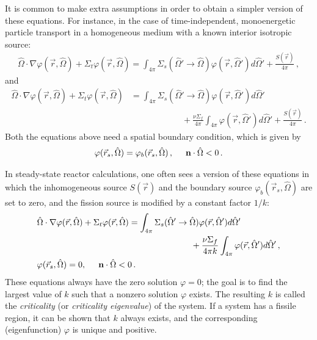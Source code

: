 \documentclass[12pt]{article}
\newcommand{\rvec}{\ensuremath{\vec{r}}}
\newcommand{\omvec}{\ensuremath{\hat{\Omega}}}
\begin{document}
It is common to make extra assumptions in order to obtain a simpler version of these equations. For instance, in the case of time-independent, monoenergetic particle transport in a homogeneous medium with a known interior isotropic source:
\begin{align*}
\omvec\cdot  \nabla \varphi(\rvec,\omvec) +
 \Sigma_t\varphi(\rvec,\omvec)
=
\int_{4\pi}\Sigma_s(\omvec'\rightarrow\omvec)
\varphi(\rvec,\omvec')d\omvec'+\frac{S(\rvec)}{4\pi}\,,
\end{align*}
and 
\begin{align*}
\omvec\cdot  \nabla \varphi(\rvec,\omvec) +
 \Sigma_t\varphi(\rvec,\omvec)%
 &=
\int_{4\pi}\Sigma_s(\omvec'\rightarrow\omvec)
\varphi(\rvec,\omvec')d\omvec'\\&\quad\quad\quad\quad\quad\quad
 +\frac{\nu\Sigma_f}{4\pi}\int_{4\pi}
\varphi(\rvec,\omvec')d\omvec'+\frac{S(\rvec)}{4\pi}\,.\nonumber
\end{align*}
Both the equations above need a spatial boundary condition, which is given by
\begin{align*}
\varphi(\rvec_s,\omvec) = \varphi_b(\rvec_s,\omvec)\,, \hspace{0.5 cm} \textbf{n} \cdot \omvec <0\,.
\end{align*}

In steady-state reactor calculations, one often sees a version of these equations in which the inhomogeneous source $S(\rvec)$ and the boundary source $\varphi_b(\rvec_s,\omvec)$ are set to zero, and the fission source is modified by a constant factor $1/k$:
\begin{align*}
&\omvec\cdot  \nabla \varphi(\rvec,\omvec) +
 \Sigma_t\varphi(\rvec,\omvec)%
 =
\int_{4\pi}\Sigma_s(\omvec'\rightarrow\omvec)
\varphi(\rvec,\omvec')d\omvec'\\&\quad\quad\quad\quad\quad\quad\quad\quad\quad\quad\quad\quad\quad\quad\quad\quad\quad\quad
 +\frac{\nu\Sigma_f}{4\pi k}\int_{4\pi}
\varphi(\rvec,\omvec')d\omvec'\,,\nonumber\\
&\varphi(\rvec_s,\omvec) = 0, \hspace{0.5 cm} \textbf{n} \cdot \omvec <0\,.
\end{align*}
These equations always have the zero solution $\varphi = 0$; the goal is to find the largest value of $k$ such that a nonzero solution $\varphi$ exists. The resulting $k$ is called the \textit{criticality} (or \textit{criticality eigenvalue}) of the system. If a system has a fissile region, it can be shown that $k$ always exists, and the corresponding (eigenfunction) $\varphi$ is unique and positive.
\end{document}
